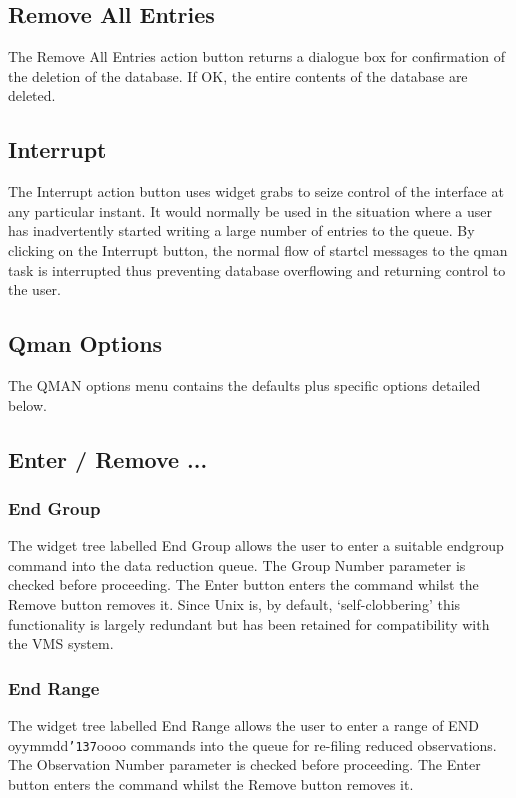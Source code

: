 \documentclass[a4paper]{book}
\renewcommand{\_}{{\tt\char'137}}
\begin{document}
\subsection{Remove All Entries}
The {\sf Remove All Entries} action button returns a dialogue box 
for confirmation of the deletion of the database. If {\sf OK}, the entire contents of the database
are deleted.

\subsection{Interrupt}
The {\sf Interrupt} action button uses widget grabs to seize control of the interface at
any particular instant. It would normally be used in the situation where a user
has inadvertently started writing a large number of entries to the queue. By clicking
on the {\sf Interrupt} button, the normal flow of {\sc startcl} messages to the
qman task is interrupted thus preventing database overflowing and returning control to
the user.

\subsection{Qman Options}
The QMAN options menu contains the defaults plus specific options detailed below.

\subsection{Enter / Remove ...}
\subsubsection{End Group}
The widget tree labelled {\sf End Group} allows the user to enter a suitable
endgroup command into the data reduction queue. The {\sf Group Number} parameter
is checked before proceeding. The {\sf Enter} button enters the command whilst the
{\sf Remove} button removes it. Since Unix is, by default, `self-clobbering' this
functionality is largely redundant but has been retained for compatibility with the
VMS system. 

\subsubsection{End Range}
The widget tree labelled {\sf End Range} allows the user to enter a range of
END oyymmdd\_oooo commands into the queue for re-filing reduced observations.
The {\sf Observation Number} parameter is checked before proceeding. The {\sf Enter} 
button enters the command whilst the {\sf Remove} button removes it. 
\end{document}
